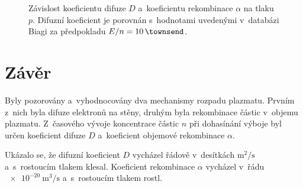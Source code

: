 \documentclass{protokol}
\newcommand\dens{n}
\newcommand\densinit{n_0}
\newcommand\pres{p}
\newcommand\diffuse{D}
\newcommand\diffuseunit{\metre\squared\per\second}
\newcommand\recomb{\alpha}
\newcommand\recombunit{\metre\cubed\per\second}
\newcommand\elfield{E}
\begin{document}
\begin{figure}[htp]
	\centering
	
	
	\caption{Závislost koeficientu difuze $\diffuse$
		a~koeficientu rekombinace $\recomb$ na tlaku $\pres$.
		Difuzní koeficient je porovnán s~hodnotami uvedenými v~databázi
		Biagi\cite{biagi} za předpokladu
		$\elfield/\dens = \SI{10}{\townsend}$.}
	\label{fig:diffuse-recomb-pres}
\end{figure}

% 	

\section{Závěr}
Byly pozorovány a~vyhodnocovány dva mechanismy rozpadu plazmatu.
Prvním z~nich byla difuze elektronů na stěny,
druhým byla rekombinace částic v~objemu plazmatu.
Z~časového vývoje koncentrace částic $\dens$ při dohasínání výboje
byl určen koeficient difuze $\diffuse$
a~koeficient objemové rekombinace $\recomb$.

Ukázalo se, že difuzní koeficient $\diffuse$ vycházel řádově
v~desítkách $\si{\diffuseunit}$ a~s~rostoucím tlakem klesal.
Koeficient rekombinace $\recomb$ vycházel v~řádu $\SI{e-20}{\recombunit}$
a~s~rostoucím tlakem rostl.
\end{document}
